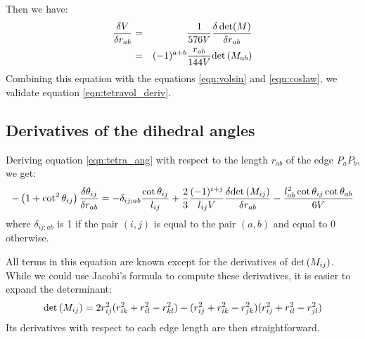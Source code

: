 \documentclass[11 pt]{article}
\newcommand {\mm}[1] {\ifmmode{#1}\else{\mbox{\(#1\)}}\fi}
\theoremstyle{plain} \theorembodyfont{\rmfamily}
\newcommand{\Deter}[1]       {\mm{\rm det\,}{#1}}
\begin{document}
Then we have:
 \begin{eqnarray}
 \frac{\delta V}{\delta r_{ab}} &=& \frac{1}{576 V} \frac{\delta \det (M)}{\delta r_{ab}} \nonumber \\
 &=& (-1)^{a+b} \frac{r_{ab}}{144 V} \Deter{(M_{ab})}
 \end{eqnarray}
 Combining this equation with the equations \ref{eqn:volsin} and \ref{eqn:coslaw}, we validate equation \ref{eqn:tetravol_deriv}. 
 
 \subsection*{Derivatives of the dihedral angles }
 
 Deriving equation \ref{eqn:tetra_ang} with respect to the length $r_{ab}$ of the edge $P_aP_b$, we get:
 \begin{eqnarray}
 -\left(1 + \cot^2{\theta_{ij}} \right) \frac{\delta \theta_{ij}}{\delta r_{ab}} = -\delta_{ij;ab} \frac{\cot{\theta_{ij}}}{l_{ij}} + \frac{2}{3} \frac{(-1)^{i+j}} {l_{ij}V} \frac{\delta \Deter{(M_{ij})}}{\delta r_{ab}} -\frac{l_{ab}^2 \cot \theta_{ij} \cot \theta_{ab}}{6V}
 \end{eqnarray}
 where $\delta_{ij;ab}$ is  1 if the pair $(i,j)$ is equal to the pair $(a,b)$ and equal to 0 otherwise.

All terms in this equation are known except for the derivatives of $\Deter{(M_{ij})}$. While we could use Jacobi's formula to compute these derivatives, it is easier to expand the determinant:
\begin{eqnarray}
\Deter{(M_{ij})}= 2 r_{ij}^2 ( r_{ik}^2 + r_{il}^2 - r_{kl}^2 ) - (r_{ij}^2+r_{ik}^2-r_{jk}^2)(r_{ij}^2+r_{il}^2-r_{jl}^2)
\end{eqnarray}
Its derivatives with respect to each edge length are then straightforward.
\end{document}
